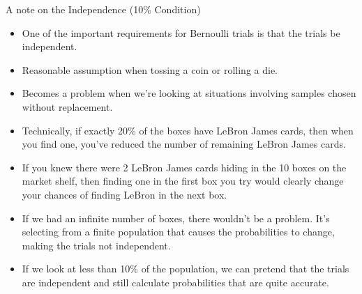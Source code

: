 \documentclass[10pt,handout]{beamer}\usepackage[]{graphicx}\usepackage[]{color}
\begin{document}
\begin{frame}{A note on the Independence (10\% Condition)}
	\small 
	\begin{itemize}
		\item One of the important requirements for Bernoulli trials is that the trials be independent. 
		\item Reasonable assumption when tossing a coin or rolling a die.
		\item Becomes a problem when we're looking at situations involving samples chosen without replacement. 
		\item Technically, if exactly 20\% of the boxes have LeBron James cards, then when you find one, you’ve reduced the number of remaining LeBron James cards. 
		\item If you knew there were 2 LeBron James cards hiding in the 10 boxes on the market shelf, then finding one in the first box you try would
		clearly change your chances of finding LeBron in the next box.
		\item If we had an infinite number of boxes, there wouldn't be a problem. It's
		selecting from a finite population that causes the probabilities to change, making
		the trials not independent. 
		\item If we look at less than 10\% of the population, we can pretend that the
		trials are independent and still calculate probabilities that are quite accurate.
	\end{itemize}
\end{frame}
\end{document}

